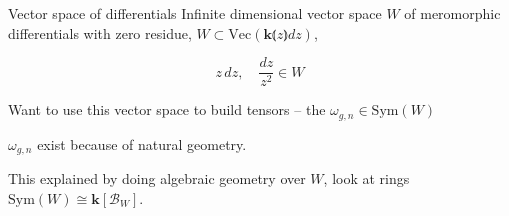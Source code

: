     
        
    \begin{frame}{Vector space of differentials}
    Infinite dimensional vector space \(W\) of meromorphic differentials with zero residue, \( W \subset \mathrm{Vec}(\mathbf{k}\lParen z \rParen dz) \), 
    \vspace{1em}
    \begin{ex}
    \[ z\, dz, \quad \frac{dz}{z^2} \in W\]
    \end{ex}
    Want to use this vector space to build tensors -- the  \(\omega_{g,n} \in \text{Sym}(W)\)
    
    \(\omega_{g,n}\) exist because of natural geometry.
    
    This explained by doing algebraic geometry over \(W\), look at rings \( \text{Sym}(W) \cong \mathbf{k}[\mathcal{B}_W]\).
    \end{frame}